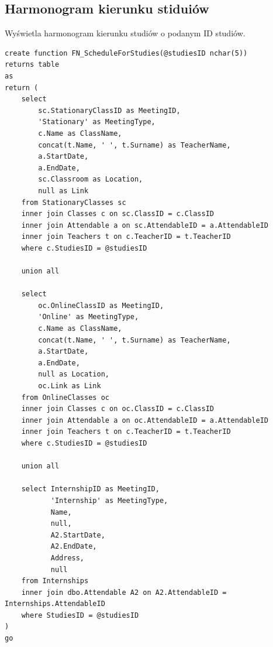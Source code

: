 \documentclass[11pt,a4paper]{article}
\begin{document}
\subsection{Harmonogram kierunku stiduiów}
Wyświetla harmonogram kierunku studiów o podanym ID studiów.
\begin{Verbatim}[breaklines=true]
create function FN_ScheduleForStudies(@studiesID nchar(5))
returns table
as
return (
    select
        sc.StationaryClassID as MeetingID,
        'Stationary' as MeetingType,
        c.Name as ClassName,
        concat(t.Name, ' ', t.Surname) as TeacherName,
        a.StartDate,
        a.EndDate,
        sc.Classroom as Location,
        null as Link
    from StationaryClasses sc
    inner join Classes c on sc.ClassID = c.ClassID
    inner join Attendable a on sc.AttendableID = a.AttendableID
    inner join Teachers t on c.TeacherID = t.TeacherID
    where c.StudiesID = @studiesID

    union all

    select
        oc.OnlineClassID as MeetingID,
        'Online' as MeetingType,
        c.Name as ClassName,
        concat(t.Name, ' ', t.Surname) as TeacherName,
        a.StartDate,
        a.EndDate,
        null as Location,
        oc.Link as Link
    from OnlineClasses oc
    inner join Classes c on oc.ClassID = c.ClassID
    inner join Attendable a on oc.AttendableID = a.AttendableID
    inner join Teachers t on c.TeacherID = t.TeacherID
    where c.StudiesID = @studiesID

    union all

    select InternshipID as MeetingID,
           'Internship' as MeetingType,
           Name,
           null,
           A2.StartDate,
           A2.EndDate,
           Address,
           null
    from Internships
    inner join dbo.Attendable A2 on A2.AttendableID = Internships.AttendableID
    where StudiesID = @studiesID
)
go
\end{Verbatim}
\end{document}

